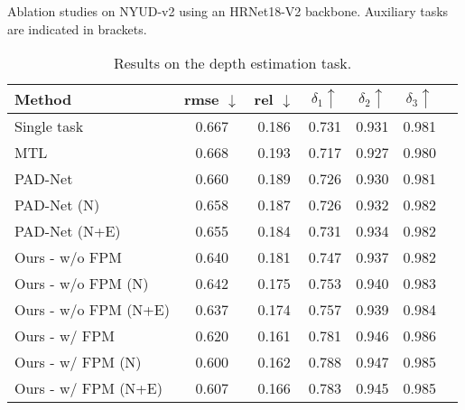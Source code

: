 \documentclass[runningheads]{llncs}
\begin{document}
\begin{table}[t]
    \caption{Ablation studies on NYUD-v2 using an HRNet18-V2 backbone. Auxiliary tasks are indicated in brackets.}
    \label{tab: supplementary_nyu}
    \begin{subtable}{1.0\linewidth}
    \centering
    \caption{Results on the depth estimation task.}
    \label{tab: nyu_depth}
    \footnotesize{\begin{tabular}{|l|c|c|c|c|c|c|}
\hline
Method & rmse $\downarrow$ & rel $\downarrow$ & $\delta_1 \uparrow$ & $\delta_2 \uparrow$ & $\delta_3 \uparrow$ \\
\hline
Single task & 0.667 & 0.186 & 0.731 & 0.931 & 0.981 \\
MTL & 0.668 & 0.193 & 0.717 & 0.927 & 0.980 \\
PAD-Net & 0.660 & 0.189 & 0.726 & 0.930 & 0.981 \\
PAD-Net (N) & 0.658 & 0.187 & 0.726 & 0.932 & 0.982 \\
PAD-Net (N+E) & 0.655 & 0.184 & 0.731 & 0.934 & 0.982 \\
\hline
Ours - w/o FPM & 0.640 & 0.181 & 0.747 & 0.937 & 0.982 \\
Ours - w/o FPM (N) & 0.642 & 0.175 & 0.753 & 0.940 & 0.983 \\
Ours - w/o FPM (N+E) & 0.637 & 0.174 & 0.757 & 0.939 & 0.984 \\
\hline
Ours - w/ FPM & 0.620 & 0.161 & 0.781 & 0.946 & 0.986 \\
Ours - w/ FPM (N) & 0.600 & 0.162 & 0.788 & 0.947 & 0.985 \\
Ours - w/ FPM (N+E) & 0.607 & 0.166 & 0.783 & 0.945 & 0.985 \\
\hline
\end{tabular}}
    \end{subtable}

    \bigskip
   

\end{table}
\end{document}
